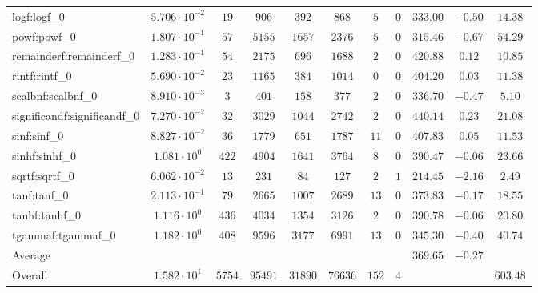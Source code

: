 \begin{tabular}{|l|c|c|c|c|c|c|c|c|c|c|}
logf:logf\_0                 & $ 5.706 \cdot 10^{-2} $ & $ 19     $ & $ 906   $ & $ 392   $ & $ 868   $ & $ 5   $ & $ 0 $ & $ 333.00      $ & $ -0.50   $ & $ 14.38   $ \\
powf:powf\_0                 & $ 1.807 \cdot 10^{-1} $ & $ 57     $ & $ 5155  $ & $ 1657  $ & $ 2376  $ & $ 5   $ & $ 0 $ & $ 315.46      $ & $ -0.67   $ & $ 54.29   $ \\
remainderf:remainderf\_0     & $ 1.283 \cdot 10^{-1} $ & $ 54     $ & $ 2175  $ & $ 696   $ & $ 1688  $ & $ 2   $ & $ 0 $ & $ 420.88      $ & $ 0.12    $ & $ 10.85   $ \\
rintf:rintf\_0               & $ 5.690 \cdot 10^{-2} $ & $ 23     $ & $ 1165  $ & $ 384   $ & $ 1014  $ & $ 0   $ & $ 0 $ & $ 404.20      $ & $ 0.03    $ & $ 11.38   $ \\
scalbnf:scalbnf\_0           & $ 8.910 \cdot 10^{-3} $ & $ 3      $ & $ 401   $ & $ 158   $ & $ 377   $ & $ 2   $ & $ 0 $ & $ 336.70      $ & $ -0.47   $ & $ 5.10    $ \\
significandf:significandf\_0 & $ 7.270 \cdot 10^{-2} $ & $ 32     $ & $ 3029  $ & $ 1044  $ & $ 2742  $ & $ 2   $ & $ 0 $ & $ 440.14      $ & $ 0.23    $ & $ 21.08   $ \\
sinf:sinf\_0                 & $ 8.827 \cdot 10^{-2} $ & $ 36     $ & $ 1779  $ & $ 651   $ & $ 1787  $ & $ 11  $ & $ 0 $ & $ 407.83      $ & $ 0.05    $ & $ 11.53   $ \\
sinhf:sinhf\_0               & $ 1.081 \cdot 10^{0}  $ & $ 422    $ & $ 4904  $ & $ 1641  $ & $ 3764  $ & $ 8   $ & $ 0 $ & $ 390.47      $ & $ -0.06   $ & $ 23.66   $ \\
sqrtf:sqrtf\_0               & $ 6.062 \cdot 10^{-2} $ & $ 13     $ & $ 231   $ & $ 84    $ & $ 127   $ & $ 2   $ & $ 1 $ & $ 214.45      $ & $ -2.16   $ & $ 2.49    $ \\
tanf:tanf\_0                 & $ 2.113 \cdot 10^{-1} $ & $ 79     $ & $ 2665  $ & $ 1007  $ & $ 2689  $ & $ 13  $ & $ 0 $ & $ 373.83      $ & $ -0.17   $ & $ 18.55   $ \\
tanhf:tanhf\_0               & $ 1.116 \cdot 10^{0}  $ & $ 436    $ & $ 4034  $ & $ 1354  $ & $ 3126  $ & $ 2   $ & $ 0 $ & $ 390.78      $ & $ -0.06   $ & $ 20.80   $ \\
tgammaf:tgammaf\_0           & $ 1.182 \cdot 10^{0}  $ & $ 408    $ & $ 9596  $ & $ 3177  $ & $ 6991  $ & $ 13  $ & $ 0 $ & $ 345.30      $ & $ -0.40   $ & $ 40.74   $ \\
\hline
Average                      & $                     $ & $        $ & $       $ & $       $ & $       $ & $     $ & $   $ & $ 369.65      $ & $ -0.27   $ & $         $ \\
\hline
Overall                      & $ 1.582 \cdot 10^{1}  $ & $ 5754   $ & $ 95491 $ & $ 31890 $ & $ 76636 $ & $ 152 $ & $ 4 $ & $             $ & $         $ & $ 603.48  $ \\
\hline
\end{tabular}
